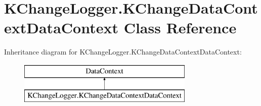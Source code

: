\hypertarget{class_k_change_logger_1_1_k_change_data_context_data_context}{\section{K\-Change\-Logger.\-K\-Change\-Data\-Context\-Data\-Context Class Reference}
\label{class_k_change_logger_1_1_k_change_data_context_data_context}
}
Inheritance diagram for K\-Change\-Logger.\-K\-Change\-Data\-Context\-Data\-Context\-:\begin{figure}[H]
\begin{center}
\leavevmode
\includegraphics[height=2.000000cm]{class_k_change_logger_1_1_k_change_data_context_data_context}
\end{center}
\end{figure}

